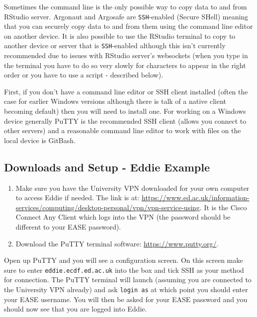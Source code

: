 \documentclass[
]{book}
\providecommand{\tightlist}{%
  \setlength{\itemsep}{0pt}\setlength{\parskip}{0pt}}
\begin{document}
Sometimes the command line is the only possible way to copy data to and from RStudio server. Argonaut and Argosafe are \texttt{SSH}-enabled (Secure SHell) meaning that you can securely copy data to and from them using the command line editor on another device. It is also possible to use the RStudio terminal to copy to another device or server that is \texttt{SSH}-enabled although this isn't currently recommended due to issues with RStudio server's websockets (when you type in the terminal you have to do so very slowly for characters to appear in the right order or you have to use a script - described below).

First, if you don't have a command line editor or SSH client installed (often the case for earlier Windows versions although there is talk of a native client becoming default) then you will need to install one. For working on a Windows device generally PuTTY is the recommended SSH client (allows you connect to other servers) and a reasonable command line editor to work with files on the local device is GitBash.

\hypertarget{downloads-and-setup---eddie-example}{%
\subsection{Downloads and Setup - Eddie Example}\label{downloads-and-setup---eddie-example}}

\begin{enumerate}
\def\labelenumi{\arabic{enumi}.}
\tightlist
\item
  Make sure you have the University VPN downloaded for your own computer to access Eddie if needed. The link is at: \url{https://www.ed.ac.uk/information-services/computing/desktop-personal/vpn/vpn-service-using}. It is the Cisco Connect Any Client which logs into the VPN (the password should be different to your EASE password).\\
\item
  Download the PuTTY terminal software: \url{https://www.putty.org/}.
\end{enumerate}

Open up PuTTY and you will see a configuration screen. On this screen make sure to enter \texttt{eddie.ecdf.ed.ac.uk} into the box and tick SSH as your method for connection. The PuTTY terminal will launch (assuming you are connected to the University VPN already) and ask \texttt{login\ as} at which point you should enter your EASE username. You will then be asked for your EASE password and you should now see that you are logged into Eddie.
\end{document}
